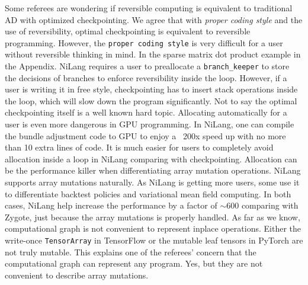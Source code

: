 \documentclass{article}
\begin{document}
Some referees are wondering if reversible computing is equivalent to traditional AD with optimized checkpointing.
We agree that with \textit{proper coding style} and the use of reversibility, optimal checkpointing is equivalent to reversible programming.
However, the \texttt{proper coding style} is very difficult for a user without reversible thinking in mind.
In the sparse matrix dot product example in the Appendix.
NiLang requires a user to preallocate a \texttt{branch\_keeper} to store the decisions of branches to enforce reversibility inside the loop.
However, if a user is writing it in free style, checkpointing has to insert stack operations inside the loop, which will slow down the program significantly.
Not to say the optimal checkpointing itself is a well known hard topic.
Allocating automatically for a user is even more dangerous in GPU programming.
In NiLang, one can compile the bundle adjustment code to GPU to enjoy a ~200x speed up with no more than 10 extra lines of code.
It is much easier for users to completely avoid allocation inside a loop in NiLang comparing with checkpointing.
Allocation can be the performance killer when differentiating array mutation operations.
NiLang supports array mutations naturally. As NiLang is getting more users, some use it to differentiate backtest policies and variational mean field computing. In both cases, NiLang help increase the performance by a factor of $\sim600$ comparing with Zygote, just because the array mutations is properly handled.
As far as we know, computational graph is not convenient to represent inplace operations.
Either the write-once \texttt{TensorArray} in TensorFlow or the mutable leaf tensors in PyTorch are not truly mutable.
This explains one of the referees' concern that the computational graph can represent any program.
Yes, but they are not convenient to describe array mutations.

\end{document}
